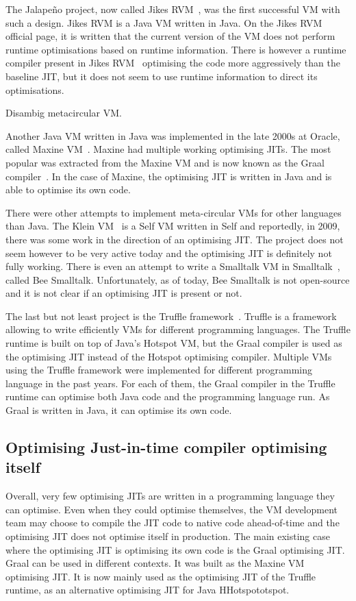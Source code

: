 \documentclass[a4paper,12pt,twoside]{../includes/ThesisStyle}
\begin{document}
The Jalape\~no project, now called Jikes RVM~\cite{Alp99a}, was the first successful VM with such a design. Jikes RVM is a Java VM written in Java. On the Jikes RVM official page, it is written that the current version of the VM does not perform runtime optimisations based on runtime information. There is however a runtime compiler present in Jikes RVM~\cite{Arn00} optimising the code more aggressively than the baseline JIT, but it does not seem to use runtime information to direct its optimisations. 

Disambig metacircular VM.

Another Java VM written in Java was implemented in the late 2000s at Oracle, called Maxine VM~\cite{Wimm13a}. Maxine had multiple working optimising JITs. The most popular was extracted from the Maxine VM and is now known as the Graal compiler~\cite{Oracle13,Dubo13c}. In the case of Maxine, the optimising JIT is written in Java and is able to optimise its own code.

There were other attempts to implement meta-circular VMs for other languages than Java. The Klein VM~\cite{Unga05b} is a Self VM written in Self and reportedly, in 2009, there was some work in the direction of an optimising JIT. The project does not seem however to be very active today and the optimising JIT is definitely not fully working. There is even an attempt to write a Smalltalk VM in Smalltalk~\cite{Pim14a}, called Bee Smalltalk. Unfortunately, as of today, Bee Smalltalk is not open-source and it is not clear if an optimising JIT is present or not.

The last but not least project is the Truffle framework~\cite{Wur13a}. Truffle is a framework allowing to write efficiently VMs for different programming languages. The Truffle runtime is built on top of Java's Hotspot VM, but the Graal compiler is used as the optimising JIT instead of the Hotspot optimising compiler. 
Multiple VMs using the Truffle framework were implemented for different programming language in the past years. For each of them, the Graal compiler in the Truffle runtime can optimise both Java code and the programming language run. As Graal is written in Java, it can optimise its own code.
 
\subsection{Optimising Just-in-time compiler optimising itself}

Overall, very few optimising JITs are written in a programming language they can optimise. Even when they could optimise themselves, the VM development team may choose to compile the JIT code to native code ahead-of-time and the optimising JIT does not optimise itself in production. The main existing case where the optimising JIT is optimising its own code is the Graal optimising JIT. Graal can be used in different contexts. It was built as the Maxine VM optimising JIT. It is now mainly used as the optimising JIT of the Truffle runtime, as an alternative optimising JIT for Java HHotspototspot.
\end{document}
